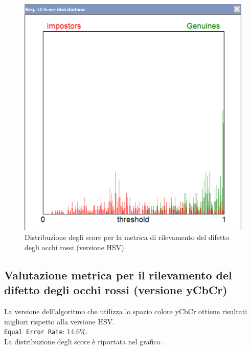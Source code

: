 \documentclass[12pt,a4paper,openright,twoside]{book}
\begin{document}
\begin{figure}
    \centering
    \includegraphics[width=.8\linewidth]{figures/score-distribution-red-eye-with-hsv.png}
    \caption{Distribuzione degli score per la metrica di rilevamento del difetto degli occhi rossi (versione HSV)}
    \label{fig:score_distribution_red_eye_with_hsv}
\end{figure}

\subsection{Valutazione metrica per il rilevamento del difetto degli occhi rossi (versione yCbCr)}
La versione dell'algoritmo che utilizza lo spazio colore yCbCr ottiene risultati migliori rispetto alla versione HSV. \\[4pt]
\texttt{Equal Error Rate}: 14.6\%. \\
La distribuzione degli score è riportata nel grafico .
\end{document}
